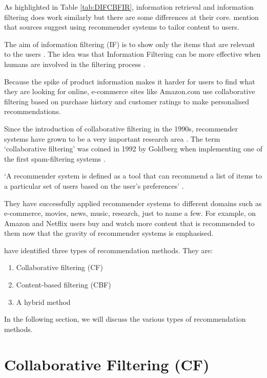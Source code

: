 As highlighted in Table \ref{tab:DIFCBFIR}, information retrieval and information filtering does work similarly but there are some differences at their core.  mention that sources suggest using recommender systems to tailor content to users.

The aim of information filtering (IF) is to show only the items that are relevant to the users \cite{Hanani2001}. The idea was that Information Filtering can be more effective when humans are involved in the filtering process \cite{Hanani2001}.

Because the spike of product information makes it harder for users to find what they are looking for online, e-commerce sites like Amazon.com use collaborative filtering based on purchase history and customer ratings to make personalised recommendations.

Since the introduction of collaborative filtering in the 1990s, recommender systems have grown to be a very important research area \cite{resnick1994grouplens,shardanand1995social}. The term ‘collaborative filtering’ was coined in 1992 by Goldberg when implementing one of the first spam-filtering systems \cite{goldberg1992using}.

‘A recommender system is defined as a tool that can recommend a list of items to a particular set of users based on the user’s preferences’ \cite[p.~4]{ricci2011introduction}.

They have successfully applied recommender systems to different domains such as e-commerce, movies, news, music, research, just to name a few. For example, on Amazon and Netflix users buy and watch more content that is recommended to them \cite{Andre2018} now that the gravity of recommender systems is emphasised.

 have identified three types of recommendation methods. They are:
\begin{enumerate}
    \item Collaborative filtering (CF)
    \item Content-based filtering (CBF)
    \item A hybrid method
\end{enumerate}
In the following section, we will discuss the various types of recommendation methods.

\section{Collaborative Filtering (CF)}  \label{sec:collab}

